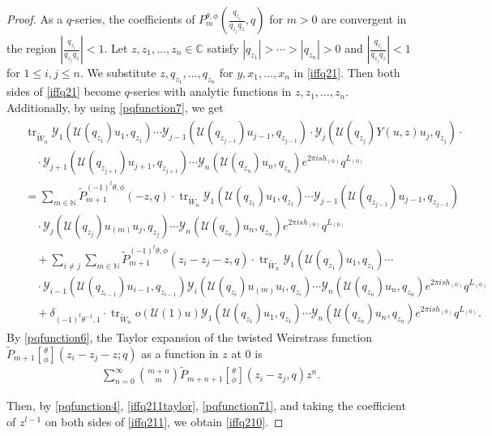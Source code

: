 \documentclass[9pt]{amsart}
\newcommand{\Y}{\mathcal{Y}}
\begin{document}
\begin{proof}
As a $q$-series, the coefficients of $P_{m}^{\theta, \phi}\left(\frac{q_{z_i}}{q_{z_j} q_z}, q\right)$ for $m > 0$ are convergent in the region $\left| \frac{q_{z_i}}{q_{z_j} q_z} \right| < 1$. Let $z, z_1, \ldots, z_n \in \mathbb{C}$ satisfy $|q_{z_1}| > \cdots > |q_{z_n}| > 0$ and $\left| \frac{q_{z_i}}{q_{z_j} q_z} \right| < 1$ for $1 \leq i,j \leq n$. 
We substitute $z, q_{z_1}, \ldots, q_{z_n}$ for $y, x_1, \ldots, x_n$ in \eqref{iffq21}. Then both sides of \eqref{iffq21} become $q$-series with analytic functions in $z, z_1, \ldots, z_n$. Additionally, by using \eqref{pqfunction7}, we get
\begin{align}\label{iffq211}
\begin{split}
  &\operatorname{tr}_{\tilde{W}_n} \Y_1(\mathcal{U}(q_{z_1})u_1, q_{z_1}) \cdots \Y_{j-1}(\mathcal{U}(q_{z_{j-1}})u_{j-1}, q_{z_{j-1}}) \cdot \Y_j(\mathcal{U}(q_{z_j})Y(u, z)u_j, q_{z_j}) \cdot \\
  &\quad\cdot \Y_{j+1}(\mathcal{U}(q_{z_{j+1}})u_{j+1}, q_{z_{j+1}}) \cdots \Y_n(\mathcal{U}(q_{z_n})u_n, q_{z_n}) e^{2\pi i s h_{(0)}} q^{L_{(0)}} \\
  &= \sum_{m \in \mathbb{N}} \tilde{P}_{m+1}^{(-1)^t\theta, \phi}(-z, q) \cdot \operatorname{tr}_{\tilde{W}_n} \Y_1(\mathcal{U}(q_{z_1})u_1, q_{z_1}) \cdots \Y_{j-1}(\mathcal{U}(q_{z_{j-1}})u_{j-1}, q_{z_{j-1}}) \\
  &\quad\cdot \Y_j(\mathcal{U}(q_{z_j})u_{(m)}u_j, q_{z_j}) \cdots \Y_n(\mathcal{U}(q_{z_n})u_n, q_{z_n}) e^{2\pi i s h_{(0)}} q^{L_{(0)}} \\
  &\quad + \sum_{i \neq j} \sum_{m \in \mathbb{N}} \tilde{P}_{m+1}^{(-1)^t\theta, \phi}(z_i - z_j - z, q) \cdot \operatorname{tr}_{\tilde{W}_n} \Y_1(\mathcal{U}(q_{z_1})u_1, q_{z_1}) \cdots \\
  &\quad\cdot \Y_{i-1}(\mathcal{U}(q_{z_{i-1}})u_{i-1}, q_{z_{i-1}}) \Y_i(\mathcal{U}(q_{z_i})u_{(m)}u_i, q_{z_i}) \cdots \Y_n(\mathcal{U}(q_{z_n})u_n, q_{z_n}) e^{2\pi i s h_{(0)}} q^{L_{(0)}} \\
  &\quad + \delta_{(-1)^t\theta^{-1}, 1} \cdot \operatorname{tr}_{\tilde{W}_n} o(\mathcal{U}(1)u) \Y_1(\mathcal{U}(q_{z_1})u_1, q_{z_1}) \cdots \Y_n(\mathcal{U}(q_{z_n})u_n, q_{z_n}) e^{2\pi i s h_{(0)}} q^{L_{(0)}}.
\end{split}
\end{align}
By \eqref{pqfunction6}, the Taylor expansion of the twisted Weirstrass function $\tilde{P}_{m+1}\genfrac[]{0pt}{0}{\theta}{\phi}(z_i - z_j - z; q)$ as a function in $z$ at $0$ is
\begin{align}\label{iffq211taylor}
  \sum_{n=0}^{\infty} \binom{m+n}{m} \tilde{P}_{m+n+1}\genfrac[]{0pt}{0}{\theta}{\phi}(z_i - z_j, q) z^n.
\end{align}

\noindent Then, by \eqref{pqfunction4}, \eqref{iffq211taylor}, \eqref{pqfunction71}, and taking the coefficient of $z^{l-1}$ on both sides of \eqref{iffq211}, we obtain \eqref{iffq210}.
\end{proof}
\end{document}
